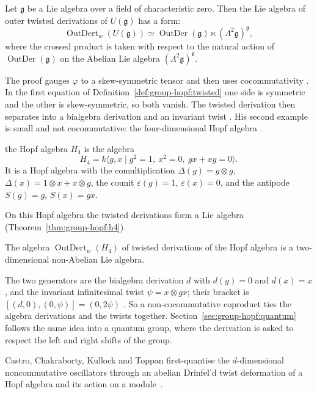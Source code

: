 \begin{theorem}\label{thm:group-hopf:davydov-ug}
Let $\mathfrak{g}$ be a Lie algebra over a field of characteristic zero. Then the Lie
algebra of outer twisted derivations of $U(\mathfrak{g})$ has a form:
\[
\operatorname{OutDert}_w(U(\mathfrak{g}))\simeq\operatorname{OutDer}(\mathfrak{g})
\ltimes(\Lambda^{2}\mathfrak{g})^{\mathfrak{g}},
\]
where the crossed product is taken with respect to the natural action of
$\operatorname{OutDer}(\mathfrak{g})$ on the Abelian Lie algebra
$(\Lambda^{2}\mathfrak{g})^{\mathfrak{g}}$.
\end{theorem}

The proof gauges $\varphi$ to a skew-symmetric tensor and then uses
cocommutativity \cite[pp.~577--578]{Davydov2013}. In the first equation of
Definition~\ref{def:group-hopf:twisted} one side is symmetric and the other is
skew-symmetric, so both vanish. The twisted derivation then separates into a
bialgebra derivation and an invariant twist \cite[pp.~577--578]{Davydov2013}.
His second example is small and not cocommutative: the four-dimensional
Hopf algebra \cite[p.~580]{Davydov2013}.

\begin{example}\label{ex:group-hopf:h4}
the Hopf algebra $H_4$ is the algebra
\[
H_4=k\langle g,x\mid g^{2}=1,\ x^{2}=0,\ gx+xg=0\rangle.
\]
It is a Hopf algebra with the comultiplication $\Delta(g)=g\otimes g$,
$\Delta(x)=1\otimes x+x\otimes g$, the counit $\varepsilon(g)=1$, $\varepsilon(x)=0$,
and the antipode $S(g)=g$, $S(x)=gx$.
\end{example}

On this Hopf algebra the twisted derivations form a Lie algebra
(Theorem~\ref{thm:group-hopf:h4}).

\begin{theorem}\label{thm:group-hopf:h4}
The algebra $\operatorname{OutDert}_w(H_4)$ of twisted derivations of the Hopf
algebra is a two-dimensional non-Abelian Lie algebra.
\end{theorem}

The two generators are the bialgebra derivation $d$ with $d(g)=0$ and
$d(x)=x$, and the invariant infinitesimal twist $\psi=x\otimes gx$; their
bracket is $[(d,0),(0,\psi)]=(0,2\psi)$ \cite[p.~580]{Davydov2013}. So a
non-cocommutative coproduct ties the algebra derivations and the twists
together. Section~\ref{sec:group-hopf:quantum} follows the same idea into a
quantum group, where the derivation is asked to respect the left and right
shifts of the group.

Castro, Chakraborty, Kullock and Toppan first-quantise the $d$-dimensional
noncommutative oscillators through an abelian Drinfel'd twist deformation of a
Hopf algebra and its action on a
module~\cite{WlNoncommutativeOscillatorsFromA2011}.
